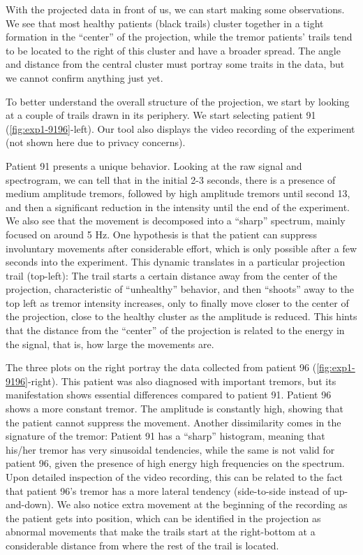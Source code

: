 With the projected data in front of us, we can start making some observations. We see that most healthy patients (black trails) cluster together in a tight formation in the ``center'' of the projection, while the tremor patients' trails tend to be located to the right of this cluster and have a broader spread. The angle and distance from the central cluster must portray some traits in the data, but we cannot confirm anything just yet.   

To better understand the overall structure of the projection, we  start by looking at a couple of trails drawn in its periphery. We start selecting patient 91 (\cref{fig:exp1-9196}-left). Our tool also displays the video recording of the experiment (not shown here due to privacy concerns). 

Patient 91 presents a unique behavior. Looking at the raw signal and spectrogram, we can tell that in the initial 2-3 seconds, there is a presence of medium amplitude tremors, followed by high amplitude tremors until second 13, and then a significant reduction in the intensity until the end of the experiment. We also see that the movement is decomposed into a ``sharp'' spectrum, mainly focused on around 5 Hz. One hypothesis is that the patient can suppress involuntary movements after considerable effort, which is only possible after a few seconds into the experiment. This dynamic translates in a particular projection trail (top-left): The trail starts a certain distance away from the center of the projection, characteristic of ``unhealthy'' behavior, and then ``shoots'' away to the top left as tremor intensity increases, only to finally move closer to the center of the projection, close to the healthy cluster as the amplitude is reduced. This hints that the distance from the ``center'' of the projection is related to the energy in the signal, that is, how large the movements are. 

The three plots on the right portray the data collected from patient 96 (\cref{fig:exp1-9196}-right). This patient was also diagnosed with important tremors, but its manifestation shows essential differences compared to patient 91. Patient 96 shows a more constant tremor. The amplitude is constantly high, showing that the patient cannot suppress the movement. Another dissimilarity comes in the signature of the tremor: Patient 91 has a ``sharp'' histogram, meaning that his/her tremor has very sinusoidal tendencies, while the same is not valid for patient 96, given the presence of high energy high frequencies on the spectrum. Upon detailed inspection of the video recording, this can be related to the fact that patient 96's tremor has a more lateral tendency (side-to-side instead of up-and-down). We also notice extra movement at the beginning of the recording as the patient gets into position, which can be identified in the projection as abnormal movements that make the trails start at the right-bottom at a considerable distance from where the rest of the trail is located.  

